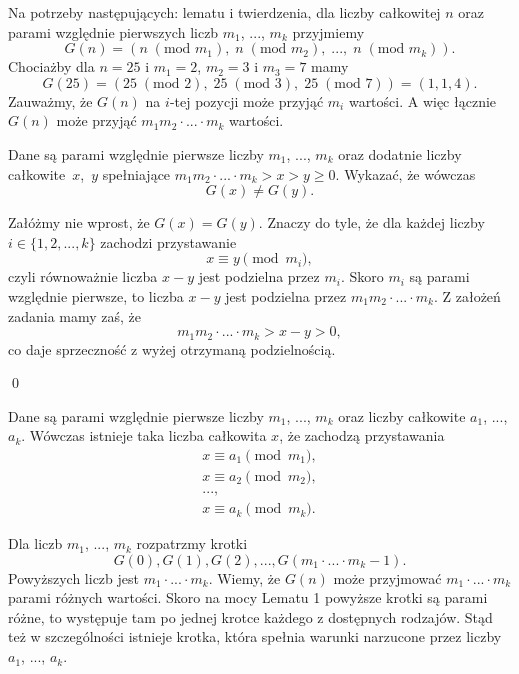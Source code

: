 

\noindent
Na potrzeby następujących: lematu i twierdzenia, dla liczby całkowitej $n$ oraz parami względnie pierwszych liczb $m_1$, ..., $m_k$ przyjmiemy
\[
	G(n) = (n \;(\text{mod } m_1),\; n \;(\text{mod } m_2),\; ...,\; n \;(\text{mod } m_k)).
\]
Chociażby dla $n = 25$ i $m_1 = 2$, $m_2 = 3$ i $m_3 = 7$ mamy
\[
	G(25) = (25 \;(\text{mod } 2),\; 25 \;(\text{mod } 3),\; 25 \;(\text{mod } 7)) = (1, 1, 4).
\]
Zauważmy, że $G(n)$ na $i$-tej pozycji może przyjąć $m_i$ wartości. A więc łącznie $G(n)$ może przyjąć $m_1m_2\cdot...\cdot m_k$ wartości.

\vspace{10px}


\noindent
Dane są parami względnie pierwsze liczby $m_1$, ..., $m_k$ oraz dodatnie liczby całkowite~$x$,~$y$ spełniające $m_1m_2\cdot ... \cdot m_k > x > y \geqslant 0$. Wykazać, że wówczas
\[
	G(x) \neq G(y).
\]


\noindent
Załóżmy nie wprost, że $G(x) = G(y)$. Znaczy do tyle, że dla każdej liczby $i \in \{1, 2, ..., k\}$ zachodzi przystawanie
\[
	x \equiv y \pmod{m_i},
\]
czyli równoważnie liczba $x - y$ jest podzielna przez $m_i$. Skoro $m_i$ są parami względnie pierwsze, to liczba $x - y$ jest podzielna przez $m_1m_2 \cdot ... \cdot m_k$. Z założeń zadania mamy zaś, że
\[
	m_1m_2 \cdot ... \cdot m_k > x - y > 0,
\]
co daje sprzeczność z wyżej otrzymaną podzielnością.

\qed

\vspace{10px}


\noindent
Dane są parami względnie pierwsze liczby $m_1$, ..., $m_k$ oraz  liczby całkowite $a_1$, ..., $a_k$. Wówczas istnieje taka liczba całkowita $x$, że zachodzą przystawania
\begin{gather*}
	x \equiv a_1 \pmod{m_1}, \\
	x \equiv a_2 \pmod{m_2}, \\
	..., \\
	x \equiv a_k \pmod{m_k}.
\end{gather*}


\noindent
Dla liczb $m_1$, ..., $m_k$ rozpatrzmy krotki
\[
	G(0), G(1), G(2), ..., G(m_1 \cdot ...\cdot m_k - 1).
\]
Powyższych liczb jest $m_1 \cdot ...\cdot m_k$. Wiemy, że $G(n)$ może przyjmować $m_1 \cdot ...\cdot m_k$ parami różnych wartości. Skoro na mocy Lematu 1 powyższe krotki są parami różne, to występuje tam po jednej krotce każdego z dostępnych rodzajów. Stąd też w szczególności istnieje krotka, która spełnia warunki narzucone przez liczby $a_1$, ..., $a_k$.

